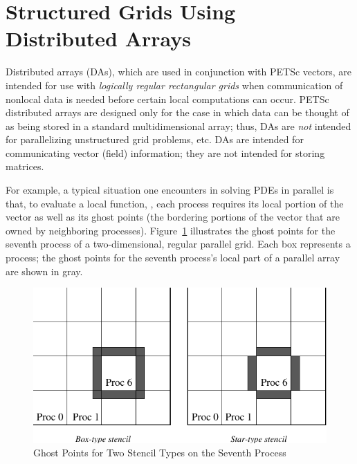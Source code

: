 \section{Structured Grids Using Distributed Arrays}
\label{sec_da} \label{sec_struct}

  Distributed arrays (DAs), which are used in
conjunction with PETSc vectors, are intended for use with {\em
logically regular rectangular grids} when communication of nonlocal data is
needed before certain local computations can occur.  PETSc distributed
arrays are designed only for the case in which data can be thought of
as being stored in a standard multidimensional array; thus, DAs 
are {\em not} intended for parallelizing unstructured grid problems, etc.
DAs are intended for communicating vector (field) information; they 
are not intended for storing matrices. 

For example, a typical situation one encounters in solving 
PDEs in parallel is that, to evaluate a local function, , each process
requires its local portion of the vector  as well as its ghost
points  (the bordering portions of the vector
that are owned by neighboring processes).  Figure~\ref{fig_ghosts}
illustrates the ghost points for the seventh process of a
two-dimensional, regular parallel grid.  Each box represents a
process; the ghost points for the seventh process's local part of
a parallel array are shown in gray.

\begin{figure}[tb]
\centerline{ \includegraphics{ghost}}
\caption{Ghost Points for Two Stencil Types on the Seventh Process}
\label{fig_ghosts}
\end{figure}

